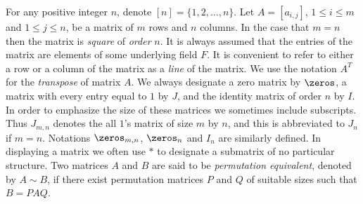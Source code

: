 \documentclass[a4paper,10pt]{llncs}
\begin{document}
For any positive integer $n$, denote $[n]=\{1, 2, \ldots, n\}$. 
Let $A = [a_{i,j}]$, $1 \leq i \leq m$ and $1 \leq j \leq n$,
be a matrix of $m$ rows and $n$ columns.
In the case that $m = n$ then the matrix is \emph{square} of \emph{order} $n$.
It is always assumed that the entries of the matrix are elements
of some underlying field $F$.
It is convenient to refer to either a row or a column of the matrix as a
\emph{line} of the matrix.
We use the notation $A^T$ for the \emph{transpose} of matrix $A$.
We always designate a zero matrix by $\zeros$, a matrix with every entry equal to
$1$ by $J$, and the identity matrix of order $n$ by $I$.
In order to emphasize the size of these matrices we sometimes include subscripts.
Thus $J_{m,n}$ denotes the all $1$'s matrix of size $m$ by $n$,
and this is abbreviated to $J_n$ if $m = n$. 
Notations $\zeros_{m,n}$, $\zeros_n$ and $I_n$ are similarly defined.
In displaying a matrix we often use $*$ to designate a submatrix of no particular structure.
Two matrices $A$ and $B$ are said to be \emph{permutation equivalent},
denoted by $A \sim B$, if there exist permutation matrices $P$ and $Q$ of
suitable sizes such that $B = PAQ$.
\end{document}
